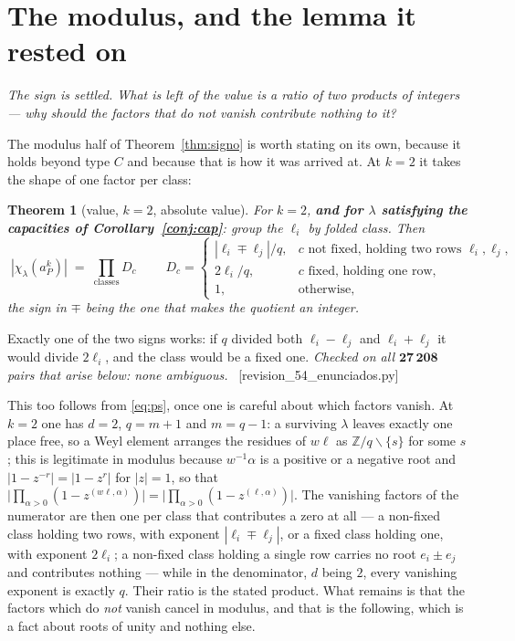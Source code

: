 \documentclass[11pt,a4paper]{article}
\newtheorem{theorem}{Theorem}[section]
\theoremstyle{definition}
\newcommand{\ZZ}{\mathbb{Z}}
\newcommand{\ver}[1]{\unskip\penalty0\ \textcolor{azul}{\small\textsf{[#1]}}}
\begin{document}
\section{The modulus, and the lemma it rested on}\label{sec:modulo}

\noindent\emph{The sign is settled. What is left of the value is a ratio of two products of integers --- why should the factors that do \emph{not} vanish contribute nothing to it?}

The modulus half of Theorem~\ref{thm:signo} is worth stating on its own, because it holds
beyond type $C$ and because that is how it was arrived at. At $k=2$ it takes the shape of one factor
per class:

\begin{theorem}[value, $k=2$, absolute value]\label{conj:val}
For $k=2$, \textbf{and for $\lambda$ satisfying the capacities of Corollary~\ref{conj:cap}}: group
the $\ell_i$ by folded class. Then
\[
\boxed{\;|\chi_\lambda(a_P^k)| \;=\; \prod_{\text{classes}} D_c\;}
\qquad
D_c=\begin{cases}
|\ell_i\mp\ell_j|/q, & c \text{ not fixed, holding two rows } \ell_i,\ell_j,\\[2pt]
2\ell_i/q, & c \text{ fixed, holding one row},\\[2pt]
1, & \text{otherwise,}
\end{cases}
\]
the sign in $\mp$ being the one that makes the quotient an integer.
\end{theorem}

\noindent Exactly one of the two signs works: if $q$ divided both $\ell_i-\ell_j$ and
$\ell_i+\ell_j$ it would divide $2\ell_i$, and the class would be a fixed one. \emph{Checked on all
$\mathbf{27\,208}$ pairs that arise below: none ambiguous.} \ver{revision\_54\_enunciados.py}

\noindent This too follows from \eqref{eq:ps}, once one is careful about which factors vanish. At
$k=2$ one has $d=2$, $q=m+1$ and $m=q-1$: a surviving $\lambda$ leaves exactly one place free, so a
Weyl element arranges the residues of $w\ell$ as $\ZZ/q\smallsetminus\{s\}$ for some $s$; this is
legitimate in modulus because $w^{-1}\alpha$ is a positive or a negative root and
$|1-z^{-r}|=|1-z^{r}|$ for $|z|=1$, so that
$\big|\prod_{\alpha>0}(1-z^{(w\ell,\alpha)})\big|=\big|\prod_{\alpha>0}(1-z^{(\ell,\alpha)})\big|$.
The
vanishing factors of the numerator are then one per class that contributes a zero at all --- a
non-fixed class holding two rows, with exponent $|\ell_i\mp\ell_j|$, or a fixed class holding one,
with exponent $2\ell_i$; a non-fixed class holding a single row carries no root $e_i\pm e_j$ and
contributes nothing --- while in the denominator, $d$ being $2$, every vanishing exponent is exactly
$q$. Their ratio is the stated product. What remains is that the
factors which do \emph{not} vanish cancel in modulus, and that is the following, which is a fact
about roots of unity and nothing else.
\end{document}
